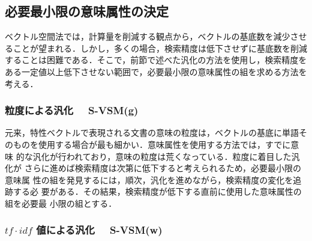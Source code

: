 \subsection{必要最小限の意味属性の決定}
\label{decision}

ベクトル空間法では，計算量を削減する観点から，ベクトルの基底数を減少させ
ることが望まれる．しかし，多くの場合，検索精度は低下させずに基底数を削減
することは困難である．そこで，前節で述べた汎化の方法を使用し，検索精度を
ある一定値以上低下させない範囲で，必要最小限の意味属性の組を求める方法を
考える．


\subsubsection{ 粒度による汎化 \ \  S-VSM(g)}

元来，特性ベクトルで表現される文書の意味の粒度は，ベクトルの基底に単語そ
のものを使用する場合が最も細かい．意味属性を使用する方法では，すでに意味
的な汎化が行われており，意味の粒度は荒くなっている．粒度に着目した汎化が
さらに進めば検索精度は次第に低下すると考えられるため，必要最小限の意味属
性の組を発見するには，順次，汎化を進めながら，検索精度の変化を追跡する必
要がある．その結果，検索精度が低下する直前に使用した意味属性の組を必要最
小限の組とする．

\subsubsection{  $tf \cdot idf$ 値による汎化 \ \ S-VSM(w) }

